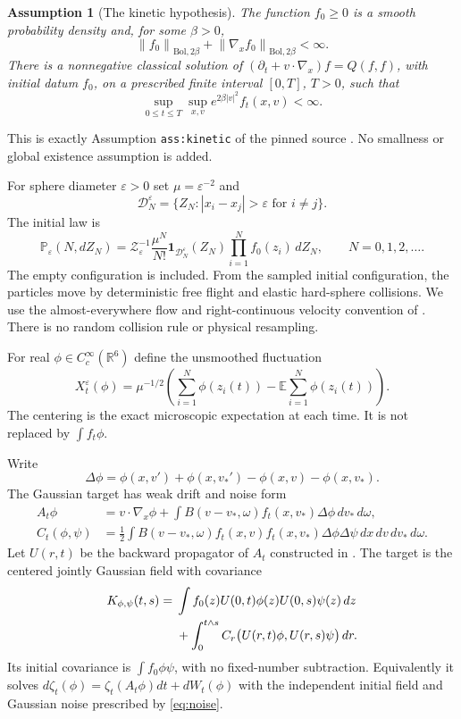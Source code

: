 \documentclass[11pt]{article}
\newcommand{\R}{\mathbb R}
\newcommand{\E}{\mathbb E}
\newcommand{\Prob}{\mathbb P}
\newcommand{\eps}{\varepsilon}
\newcommand{\ind}{\mathbf1}
\newcommand{\Bol}{\mathrm{Bol}}
\newcommand{\dd}{\,d}
\newcommand{\norm}[1]{\left\|#1\right\|}
\newtheorem{assumption}[theorem]{Assumption}
\theoremstyle{definition}\newtheorem{definition}[theorem]{Definition}
\theoremstyle{remark}\newtheorem{remark}[theorem]{Remark}
\numberwithin{equation}{section}
\begin{document}
\begin{assumption}[The kinetic hypothesis]\label{ass:kinetic}
The function $f_0\ge0$ is a smooth probability density and, for some
$\beta>0$,
\[
 \norm{f_0}_{\Bol,2\beta}+\norm{\nabla_xf_0}_{\Bol,2\beta}<\infty.
\]
There is a nonnegative classical solution of
$(\partial_t+v\cdot\nabla_x)f=Q(f,f)$, with initial datum $f_0$, on a
prescribed finite interval $[0,T]$, $T>0$, such that
\begin{equation}\label{eq:regular}
 \sup_{0\le t\le T}\sup_{x,v}e^{2\beta|v|^2}f_t(x,v)<\infty.
\end{equation}
\end{assumption}
This is exactly Assumption \texttt{ass:kinetic} of the pinned source
\cite{H}. No smallness or global existence assumption is added.

For sphere diameter $\eps>0$ set $\mu=\eps^{-2}$ and
\[
 \mathcal D_N^\eps=\{Z_N:|x_i-x_j|>\eps\text{ for }i\ne j\}.
\]
The initial law is
\begin{equation}\label{eq:law}
 \Prob_\eps(N,dZ_N)=\mathcal Z_\eps^{-1}\frac{\mu^N}{N!}
       \ind_{\mathcal D_N^\eps}(Z_N)\prod_{i=1}^Nf_0(z_i)\dd Z_N,
       \qquad N=0,1,2,\ldots.
\end{equation}
The empty configuration is included. From the sampled initial configuration,
the particles move
by deterministic free flight and elastic hard-sphere collisions. We use the
almost-everywhere flow and right-continuous velocity convention of \cite{H}.
There is no random collision rule or physical resampling.

For real $\phi\in C_c^\infty(\R^6)$ define the unsmoothed fluctuation
\begin{equation}\label{eq:field}
 X_t^\eps(\phi)=\mu^{-1/2}
    \left(\sum_{i=1}^N\phi(z_i(t))
                 -\E\sum_{i=1}^N\phi(z_i(t))\right).
\end{equation}
The centering is the exact microscopic expectation at each time. It is not
replaced by $\int f_t\phi$.

Write
\[
 \Delta\phi=\phi(x,v')+\phi(x,v_*')-\phi(x,v)-\phi(x,v_*).
\]
The Gaussian target has weak drift and noise form
\begin{align}
 A_t\phi&=v\cdot\nabla_x\phi+
    \int B(v-v_*,\omega)f_t(x,v_*)\Delta\phi\dd v_*\dd\omega,
       \label{eq:drift}\\
 C_t(\phi,\psi)&=\frac12\int B(v-v_*,\omega)f_t(x,v)f_t(x,v_*)
       \Delta\phi\Delta\psi\dd x\dd v\dd v_*\dd\omega.
       \label{eq:noise}
\end{align}
Let $U(r,t)$ be the backward propagator of $A_t$ constructed in \cite[Section
2, \texttt{lem:target-propagator}]{H}. The target is the centered jointly
Gaussian field with covariance
\begin{align}
 K_{\phi,\psi}(t,s)
 ={}&\int f_0(z)U(0,t)\phi(z)U(0,s)\psi(z)\dd z\notag\\
 &+\int_0^{t\wedge s}C_r\bigl(U(r,t)\phi,U(r,s)\psi\bigr)\dd r.
       \label{eq:covariance}
\end{align}
Its initial covariance is $\int f_0\phi\psi$, with no fixed-number
subtraction. Equivalently it solves
$d\zeta_t(\phi)=\zeta_t(A_t\phi)dt+dW_t(\phi)$ with the independent initial
field and Gaussian noise prescribed by \eqref{eq:noise}.
\end{document}
